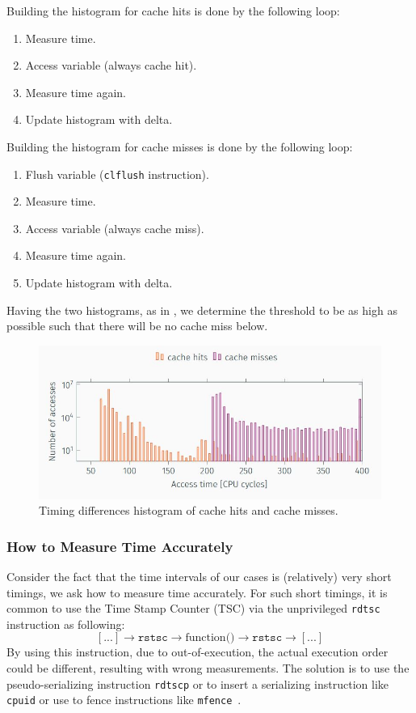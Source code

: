 \noindent Building the histogram for cache hits is done by the following loop:
\begin{enumerate}
    \item Measure time.
    \item Access variable (always cache hit).
    \item Measure time again.
    \item Update histogram with delta.
\end{enumerate}

\noindent Building the histogram for cache misses is done by the following loop:
\begin{enumerate}
    \item Flush variable (\texttt{clflush} instruction).
    \item Measure time.
    \item Access variable (always cache miss).
    \item Measure time again.
    \item Update histogram with delta.
\end{enumerate}

\noindent Having the two histograms, as in , we
determine the threshold to be as high as possible such that there will be no
cache miss below. 
\begin{figure}[!ht]
    \centering
    \includegraphics[width=\textwidth]{images/chapter_6/cache_hits_misses_hist.JPG}
    \caption{Timing differences histogram of cache hits and cache misses.}
    \label{fig:cache_hits_misses_hist}
\end{figure}

\subsubsection{How to Measure Time Accurately}
\label{subsubsec:howtomeasuretimeaccuractely}
Consider the fact that the time intervals of our cases is (relatively) very
short timings, we ask how to measure time accurately. For such short timings, it
is common to use the Time Stamp Counter (TSC) via the unprivileged
\texttt{rdtsc} instruction as following:
$$[...] \rightarrow \texttt{rstsc} \rightarrow \mbox{function()} \rightarrow
\texttt{rstsc} \rightarrow [...]$$ \noindent By using this instruction, due to
out-of-execution, the actual execution order could be different, resulting with
wrong measurements. The solution is to use the pseudo-serializing instruction
\texttt{rdtscp} or to insert a serializing instruction like \texttt{cpuid} or
use to fence instructions like \texttt{mfence}~\cite{benchmark2010}.

